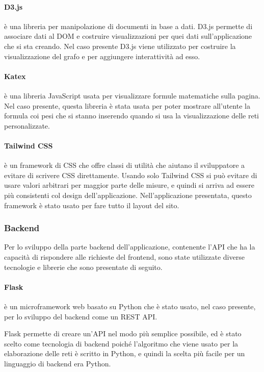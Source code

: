 \documentclass[a4paper,12pt]{report}
\begin{document}
			\paragraph*{D3.js} è una libreria per manipolazione di documenti in base a dati. D3.js permette di associare dati al DOM e costruire visualizzazioni per quei dati sull'applicazione che si sta creando. Nel caso presente D3.js viene utilizzato per costruire la visualizzazione del grafo e per aggiungere interattività ad esso. \cite{d3js} 

			\paragraph*{Katex} è una libreria JavaScript usata per visualizzare formule matematiche sulla pagina. Nel caso presente, questa libreria è stata usata per poter mostrare all'utente la formula coi pesi che si stanno inserendo quando si usa la visualizzazione delle reti personalizzate. \cite{katex} 

			\paragraph*{Tailwind CSS} è un framework di CSS che offre classi di utilità che aiutano il sviluppatore a evitare di scrivere CSS direttamente. Usando solo Tailwind CSS si può evitare di usare valori arbitrari per maggior parte delle misure, e quindi si arriva ad essere più consistenti col design dell'applicazione. Nell'applicazione presentata, questo framework è stato usato per fare tutto il layout del sito. \cite{tailwindcss} 

			\subsubsection{Backend}

			Per lo sviluppo della parte backend dell'applicazione, contenente l'API che ha la capacità di rispondere alle richieste del frontend, sono state utilizzate diverse tecnologie e librerie che sono presentate di seguito.
			
			\paragraph*{Flask} è un microframework web basato su Python che è stato usato, nel caso presente, per lo sviluppo del backend come un REST API. \cite{flaskforeword}

				Flask permette di creare un’API nel modo più semplice possibile, ed è stato scelto come tecnologia di backend poiché l'algoritmo che viene usato per la elaborazione delle reti è scritto in Python, e quindi la scelta più facile per un linguaggio di backend era Python. 
\end{document}
